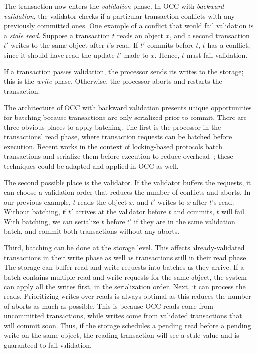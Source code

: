 The transaction now enters the \emph{validation} phase. In OCC with \emph{backward validation}, the validator checks if a particular transaction conflicts with any previously committed ones. 
One example of a conflict that would fail validation is a \emph{stale read}. Suppose a transaction $t$ reads an object $x$, and a second transaction
$t'$ writes to the same object after $t$'s read. If $t'$ commits before $t$, $t$
has a conflict, since it should have read the update $t'$ made to $x$. Hence, $t$ must fail validation. 

If a transaction passes validation, the processor sends its writes to the storage; this is the \emph{write} phase. Otherwise, the processor aborts and restarts the transaction.

The architecture of OCC with backward validation presents unique opportunities for batching because transactions are only serialized prior to commit. 
There are three obvious places to apply batching. The first is the processor in
the transactions' read phase, where transaction requests can be batched before
execution. Recent works in the context of locking-based protocols batch transactions and serialize them before execution to reduce overhead~\cite{faleiro2014rethinking,mu2014extracting,thomson2012calvin}; these techniques could be adapted and applied in OCC as well.

The second possible place is the validator. If the validator buffers the requests,
it can choose a validation order that reduces the number of conflicts and
aborts. In our previous example, $t$ reads the object $x$,
and $t'$ writes to $x$ after $t$'s read. Without batching, if $t'$ arrives at
the validator before $t$ and commits, $t$ will fail. With
batching, we can serialize $t$ before $t'$ if they are in the same validation
batch, and commit both transactions without any aborts.

Third, batching can be done at the storage level. This affects
already-validated transactions in their write phase as well as transactions
still in their read phase. The storage can buffer read and write requests into
batches as they arrive. If a batch contains multiple read and write requests for
the same object, the system can apply all the writes first, in the serialization
order. Next, it can process the reads. Prioritizing writes over reads is always
optimal as this reduces the number of aborts as much as possible. This is
because OCC reads come from uncommitted transactions, while writes come from
validated transactions that will commit soon. Thus, if the storage schedules a
pending read before a pending write on the same object, the reading transaction will see a stale value and is guaranteed to fail validation. 

